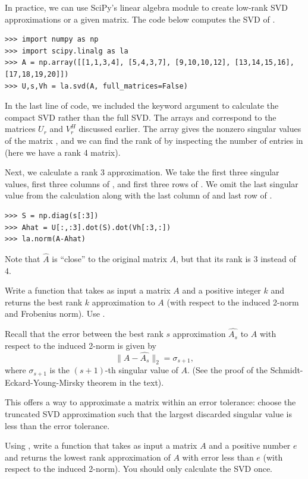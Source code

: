 In practice, we can use SciPy's linear algebra module to create low-rank SVD approximations or a given matrix.
The code below computes the SVD of .
\begin{lstlisting}
>>> import numpy as np
>>> import scipy.linalg as la
>>> A = np.array([[1,1,3,4], [5,4,3,7], [9,10,10,12], [13,14,15,16], [17,18,19,20]])
>>> U,s,Vh = la.svd(A, full_matrices=False)
\end{lstlisting}
In the last line of code, we included the keyword argument  to calculate the
compact SVD rather than the full SVD. The arrays  and  correspond to the matrices
$U_r$ and $V_r^H$ discussed earlier. The array  gives the nonzero singular values
of the matrix , and we can find the rank of  by inspecting the number of entries in  (here we have a rank 4 matrix). 

Next, we calculate a rank 3 approximation.
We take the first three singular values, first three columns of , and first three rows of .
We omit the last singular value from the calculation along with the last column of  and last row of .

\begin{lstlisting}
>>> S = np.diag(s[:3])
>>> Ahat = U[:,:3].dot(S).dot(Vh[:3,:])
>>> la.norm(A-Ahat)
\end{lstlisting}
Note that $\widehat A$ is ``close'' to the original matrix $A$, but that its rank is 3 instead of 4. 

\begin{problem}
Write a function  that takes as input a matrix $A$ and a positive integer $k$ and returns 
the best rank $k$ approximation to $A$ (with respect to the induced 2-norm and Frobenius norm).
Use .
\label{prob:svd_approx}
\end{problem}

Recall that the error between the best rank $s$ approximation $\widehat{A_s}$ to $A$ with respect to the induced 
2-norm is given by
$$
\|A - \widehat{A_s}\|_2 = \sigma_{s+1},
$$
where $\sigma_{s+1}$ is the $(s+1)$-th singular value of $A$. 
(See the proof of the Schmidt-Eckard-Young-Mirsky theorem in the text).

This offers a way to approximate a matrix within an error tolerance: 
choose the truncated SVD approximation such that the largest discarded singular value is less than the error tolerance.

\begin{problem}
Using , write a function  that takes as input a matrix $A$ and a positive number $e$ and returns
the lowest rank approximation of $A$ with error less than $e$ (with respect to the induced 2-norm).
You should only calculate the SVD once.
\end{problem}


